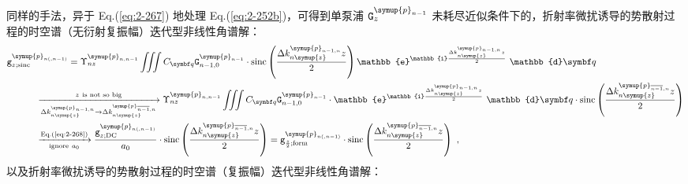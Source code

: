 同样的手法，异于 Eq.(\ref{eq:2-267}) 地处理 Eq.(\ref{eq:2-252b})，可得到单泵浦 ${\mathtt{G}}^{\symup{p}_{n-1}}_{z}$ 未耗尽近似条件下的，折射率微扰诱导的势散射过程的时空谱（无衍射复振幅）迭代型非线性角谱解：
\begin{subequations} \label{eq:2-286}
	\abovedisplayskip=13pt
	\belowdisplayskip=13pt
	\begin{align}
		{\mathtt{g}}^{\symup{p}_{n(,n-1)}}_{z;\text{sinc}} &= \Upsilon^{\symup{p}_{n,n-1}}_{nz} \iiint C_{\symbf q} {\mathtt{G}}^{\symup{p}_{n-1}}_{n-1,0} \cdot \text{sinc} \left( \frac{ \Delta k^{\symup{p}_{n-1,n}}_{n\symup{z}} z }{ 2 } \right) \mathbb{e}^{\mathbb{i} \frac{ \Delta k^{\symup{p}_{n-1,n}}_{n\symup{z}} z }{ 2 }} ~ \mathbb{d}{\symbf q} \label{eq:2-286a} \\ &\hspace{-3.5em} \xrightarrow[\Delta k^{\symup{p}_{n-1,n}}_{n\symup{z}} \to \Delta k^{\symup{p}_{\overline{n-1},n}}_{n\symup{z}}]{z\ \text{is not so big}} \Upsilon^{\symup{p}_{n,n-1}}_{nz} \iiint C_{\symbf q} {\mathtt{G}}^{\symup{p}_{n-1}}_{n-1,0} \cdot \mathbb{e}^{\mathbb{i} \frac{ \Delta k^{\symup{p}_{n-1,n}}_{n\symup{z}} z }{ 2 }} ~ \mathbb{d}{\symbf q} \cdot \text{sinc} \left( \frac{ \Delta k^{\symup{p}_{\overline{n-1},n}}_{n\symup{z}} z }{ 2 } \right) \label{eq:2-286b} \\ &\hspace{-3.5em} \xrightarrow[\text{ignore}\ a_0]{\text{Eq.(\ref{eq:2-268})}} \frac{{\mathtt{g}}^{\symup{p}_{n(,n-1)}}_{z;\text{DC}}}{a_0} \cdot \text{sinc} \left( \frac{ \Delta k^{\symup{p}_{\overline{n-1},n}}_{n\symup{z}} z }{ 2 } \right) = {\mathtt{g}}^{\symup{p}_{n(,n-1)}}_{\frac{ z }{ 2 };\text{form}} \cdot \text{sinc} \left( \frac{ \Delta k^{\symup{p}_{\overline{n-1},n}}_{n\symup{z}} z }{ 2 } \right) \label{eq:2-286c}~,
	\end{align}
\end{subequations}
以及折射率微扰诱导的势散射过程的时空谱（复振幅）迭代型非线性角谱解：
